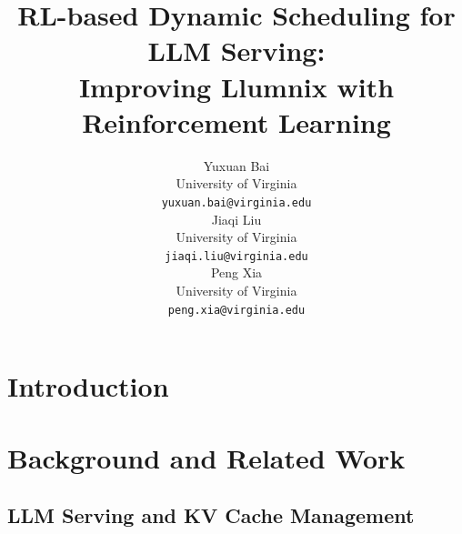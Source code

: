 \documentclass{article}
\title{RL-based Dynamic Scheduling for LLM Serving:\\Improving Llumnix with Reinforcement Learning}
\author{
  Yuxuan Bai \\
  University of Virginia \\
  \texttt{yuxuan.bai@virginia.edu} \\
  \And
  Jiaqi Liu \\
  University of Virginia \\
  \texttt{jiaqi.liu@virginia.edu} \\
  \And
  Peng Xia \\
  University of Virginia \\
  \texttt{peng.xia@virginia.edu} \\
}
\begin{document}
\maketitle

\begin{abstract}
\end{abstract}

\section{Introduction}


\section{Background and Related Work}


\subsection{LLM Serving and KV Cache Management}
\end{document}
